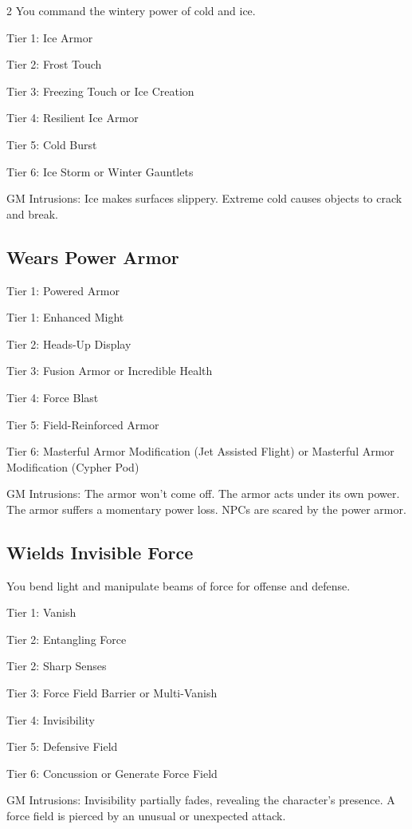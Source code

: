 \begin{multicols}{2}
You command the wintery power of cold and ice.

Tier 1: Ice Armor

Tier 2: Frost Touch

Tier 3: Freezing Touch or Ice Creation

Tier 4: Resilient Ice Armor

Tier 5: Cold Burst

Tier 6: Ice Storm or Winter Gauntlets 

GM Intrusions: Ice makes surfaces slippery. Extreme cold causes objects to crack and break.

\subsection{Wears Power Armor}

Tier 1: Powered Armor

Tier 1: Enhanced Might

Tier 2: Heads-Up Display

Tier 3: Fusion Armor or Incredible Health

Tier 4: Force Blast

Tier 5: Field-Reinforced Armor

Tier 6: Masterful Armor Modification (Jet Assisted Flight) or Masterful Armor Modification (Cypher Pod)

GM Intrusions: The armor won’t come off. The armor acts under its own power. The armor suffers a momentary power loss. NPCs are scared by the power armor.

\subsection{Wields Invisible Force}

You bend light and manipulate beams of force for offense and defense.

Tier 1: Vanish 

Tier 2: Entangling Force 

Tier 2: Sharp Senses

Tier 3: Force Field Barrier or Multi-Vanish 

Tier 4: Invisibility 

Tier 5: Defensive Field

Tier 6: Concussion or Generate Force Field 

GM Intrusions: Invisibility partially fades, revealing the character’s presence. A force field is pierced by an unusual or unexpected attack.


\end{multicols}
